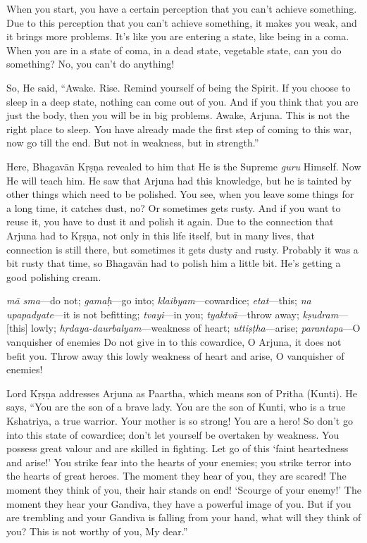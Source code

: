 When you start, you have a certain perception that you can’t achieve something. Due to this perception that you can’t achieve something, it makes you weak, and it brings more problems. It’s like you are entering a state, like being in a coma. When you are in a state of coma, in a dead state, vegetable state, can you do something? No, you can’t do anything!

So, He said, “Awake. Rise. Remind yourself of being the Spirit. If you choose to sleep in a deep state, nothing can come out of you. And if you think that you are just the body, then you will be in big problems. Awake, Arjuna. This is not the right place to sleep. You have already made the first step of coming to this war, now go till the end. But not in weakness, but in strength.”

Here, Bhagavān Kṛṣṇa revealed to him that He is the Supreme \textit{guru} Himself. Now He will teach him. He saw that Arjuna had this knowledge, but he is tainted by other things which need to be polished. You see, when you leave some things for a long time, it catches dust, no? Or sometimes gets rusty. And if you want to reuse it, you have to dust it and polish it again. Due to the connection that Arjuna had to Kṛṣṇa, not only in this life itself, but in many lives, that connection is still there, but sometimes it gets dusty and rusty. Probably it was a bit rusty that time, so Bhagavān had to polish him a little bit. He’s getting a good polishing cream.

{%
  \textit{mā sma}---do not; 
  \textit{gamaḥ}---go into; 
  \textit{klaibyam}---cowardice; 
  \textit{etat}---this; 
  \textit{na upapadyate}---it is not befitting; 
  \textit{tvayi}---in you; 
  \textit{tyaktvā}---throw away; 
  \textit{kṣudram}---[this] lowly; 
  \textit{hṛdaya-daurbalyam}---weakness of heart; 
  \textit{uttiṣṭha}---arise; 
  \textit{parantapa}---O vanquisher of enemies
}
{%
  Do not give in to this cowardice, O Arjuna, it does not befit you. Throw away this lowly weakness of heart and arise, O vanquisher of enemies!
}

Lord Kṛṣṇa addresses Arjuna as Paartha, which means son of Pritha (Kunti). He says, “You are the son of a brave lady. You are the son of Kunti, who is a true Kshatriya, a true warrior. Your mother is so strong! You are a hero! So don’t go into this state of cowardice; don’t let yourself be overtaken by weakness. You possess great valour and are skilled in fighting. Let go of this ‘faintheartedness and arise!’ You strike fear into the hearts of your enemies; you strike terror into the hearts of great heroes. The moment they hear of you, they are scared! The moment they think of you, their hair stands on end! ‘Scourge of your enemy!’ The moment they hear your Gandiva, they have a powerful image of you. But if you are trembling and your Gandiva is falling from your hand, what will they think of you? This is not worthy of you, My dear.”

